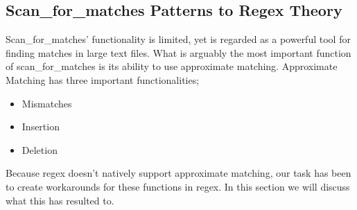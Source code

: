 
\subsection{Scan\_for\_matches Patterns to Regex Theory}
Scan\_for\_matches' functionality is limited, yet is regarded as a powerful tool 
for finding matches in large text files. What is arguably the most important 
function of scan\_for\_matches is its ability to use approximate matching. 
Approximate Matching has three important functionalities; 
\begin{itemize}
\item Mismatches
\item Insertion
\item Deletion
\end{itemize}
Because regex doesn't natively support approximate matching, our task has been 
to create workarounds for these functions in regex. 
In this section we will discuss what this has resulted to.

